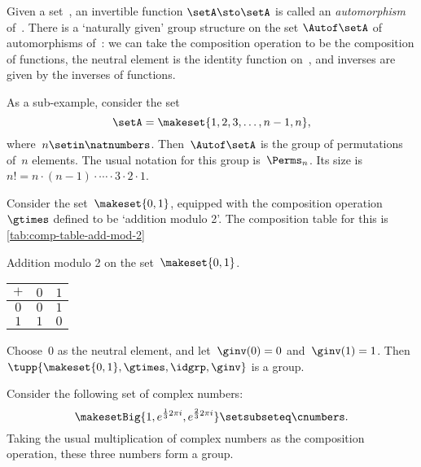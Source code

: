 \begin{example}
    Given a set~\setA, an invertible function $\setA \sto \setA$ is called an \emph{automorphism} of~\setA.
    There is a `naturally given' group structure on the set $\Autof\setA$ of automorphisms of~\setA:
    we can take the composition operation to be the composition of functions, the neutral element is the identity function on~\setA, and inverses are given by the inverses of functions.

    As a sub-example, consider the set
    \begin{equation}
        \setA = \makeset{1, 2, 3, \dots, n-1, n},
    \end{equation}
    where~$n \setin \natnumbers$.
    Then~$\Autof\setA$ is the group of permutations of~$n$ elements.
    The usual notation for this group is~$\Perms_n$.
    Its size is~$n! = n \cdot (n-1) \cdot \cdots \cdot 3 \cdot 2 \cdot 1$.

\end{example}

\begin{example}
    \label{exa:grp-order-two}
    Consider the set~$\makeset{0, 1}$, equipped with the composition operation~$\gtimes$ defined to be `addition modulo 2'.
    The composition table for this is \cref{tab:comp-table-add-mod-2}
    \begin{margintable}
        \caption{
            Addition modulo 2 on the set~$\makeset{0, 1}$.
        }
        \label{tab:comp-table-add-mod-2}
        \centering
        \begin{tabular}{c|cc}
            $+$ & $0$ & $1$ \\
            \hline
            $0$ & $0$ & $1$ \\
            $1$ & $1$ & $0$
        \end{tabular}
    \end{margintable}

    Choose~$0$ as the neutral element, and let~$\ginv(0) = 0$ and~$\ginv(1) = 1$.
    Then $\tupp{\makeset{0, 1}, \gtimes, \idgrp, \ginv}$ is a group.
\end{example}

\begin{example}
    \label{grp-order-three}
    Consider the following set of complex numbers:
    \begin{equation}
        \makesetBig{ 1, e^{\frac{1}{3}2\pi i}, e^{\frac{2 }{3}2\pi i} } \setsubseteq \cnumbers.
    \end{equation}
    Taking the usual multiplication of complex numbers as the composition operation, these three numbers form a group.
\end{example}

